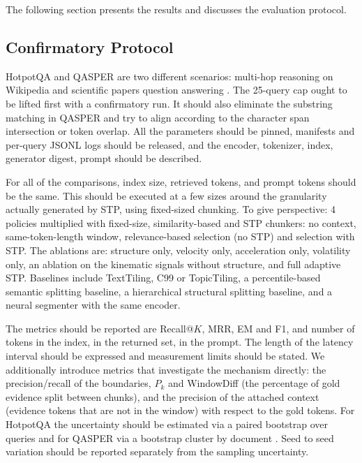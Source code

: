 \documentclass[10pt,a4paper]{article}
\begin{document}
The following section presents the results and discusses the evaluation protocol.
\label{sec:protocol}
\label{sec:results}

\subsection{Confirmatory Protocol}

HotpotQA and QASPER are two different scenarios: multi-hop reasoning on Wikipedia and scientific papers question answering \cite{yang2018hotpotqa,dasigi2021qasper}. The 25-query cap ought to be lifted first with a confirmatory run. It should also eliminate the substring matching in QASPER and try to align according to the character span intersection or token overlap. All the parameters should be pinned, manifests and per-query JSONL logs should be released, and the encoder, tokenizer, index, generator digest, prompt should be described.

For all of the comparisons, index size, retrieved tokens, and prompt tokens should be the same. This should be executed at a few sizes around the granularity actually generated by STP, using fixed-sized chunking. To give perspective: 4 policies multiplied with fixed-size, similarity-based and STP chunkers: no context, same-token-length window, relevance-based selection (no STP) and selection with STP. The ablations are: structure only, velocity only, acceleration only, volatility only, an ablation on the kinematic signals without structure, and full adaptive STP. Baselines include TextTiling, C99 or TopicTiling, a percentile-based semantic splitting baseline, a hierarchical structural splitting baseline, and a neural segmenter with the same encoder.

The metrics should be reported are Recall@$K$, MRR, EM and F1, and number of tokens in the index, in the returned set, in the prompt. The length of the latency interval should be expressed and measurement limits should be stated. We additionally introduce metrics that investigate the mechanism directly: the precision/recall of the boundaries, $P_k$ and WindowDiff \cite{beeferman1999statistical,pevzner2002windowdiff} (the percentage of gold evidence split between chunks), and the precision of the attached context (evidence tokens that are not in the window) with respect to the gold tokens. For HotpotQA the uncertainty should be estimated via a paired bootstrap over queries and for QASPER via a bootstrap cluster by document \parencite{efron1993bootstrap,field2007bootstrapping}. Seed to seed variation should be reported separately from the sampling uncertainty.
\end{document}
